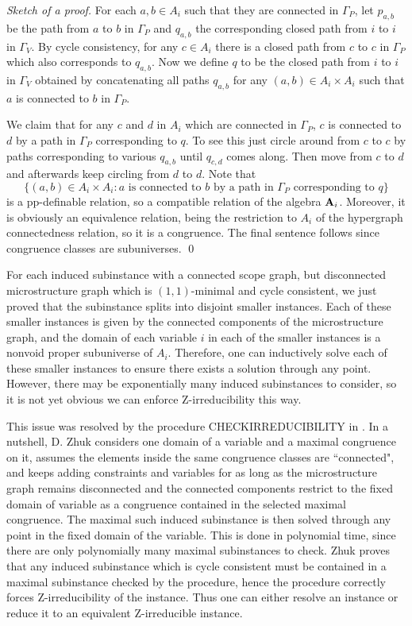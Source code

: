 \documentclass[11pt]{amsart}
\newcommand{\m}[1]{{\uppercase {\mathbf {#1}}}}
\theoremstyle{definition}
\begin{document}
{\em Sketch of a proof.}
For each $a,b\in A_i$ such that they are connected in $\Gamma_P$, let $p_{a,b}$ be the path from $a$ to $b$ in $\Gamma_P$ and $q_{a,b}$ the corresponding closed path from $i$ to $i$ in $\Gamma_V$. By cycle consistency, for any $c\in A_i$ there is a closed path from $c$ to $c$ in $\Gamma_P$ which also corresponds to $q_{a,b}$. Now we define $q$ to be the closed path from $i$ to $i$ in $\Gamma_V$ obtained by concatenating all paths $q_{a,b}$ for any $(a,b)\in A_i\times A_i$ such that $a$ is connected to $b$ in $\Gamma_P$. 

We claim that for any $c$ and $d$ in $A_i$ which are connected in $\Gamma_P$, $c$ is connected to $d$ by a path in $\Gamma_P$ corresponding to $q$. To see this just circle around from $c$ to $c$ by paths corresponding to various $q_{a,b}$ until $q_{c,d}$ comes along. Then move from $c$ to $d$ and afterwards keep circling from $d$ to $d$. Note that
$$\{(a,b)\in A_i\times A_i: a\text{ is connected to }b\text{ by a path in }\Gamma_P\text{ corresponding to }q\}$$
is a pp-definable relation, so a compatible relation of the algebra $\m a_i$. Moreover, it is obviously an equivalence relation, being the restriction to $A_i$ of the hypergraph connectedness relation, so it is a congruence. The final sentence follows since congruence classes are subuniverses.
\qed

For each induced subinstance with a connected scope graph, but disconnected microstructure graph which is $(1,1)$-minimal and cycle consistent, we just proved that the subinstance splits into disjoint smaller instances. Each of these smaller instances is given by the connected components of the microstructure graph, and the domain of each variable $i$ in each of the smaller instances is a nonvoid proper subuniverse of $A_i$. Therefore, one can inductively solve each of these smaller instances to ensure there exists a solution through any point. However, there may be exponentially many induced subinstances to consider, so it is not yet obvious we can enforce Z-irreducibility this way.

This issue was resolved by the procedure CHECKIRREDUCIBILITY in \cite{Zhdich}. In a nutshell, D. Zhuk considers one domain of a variable and a maximal congruence on it, assumes the elements inside the same congruence classes are ``connected", and keeps adding constraints and variables for as long as the microstructure graph remains disconnected and the connected components restrict to the fixed domain of variable as a congruence contained in the selected maximal congruence. The maximal such induced subinstance is then solved through any point in the fixed domain of the variable. This is done in polynomial time, since there are only polynomially many maximal subinstances to check. Zhuk proves that any induced subinstance which is cycle consistent must be contained in a maximal subinstance checked by the procedure, hence the procedure correctly forces Z-irreducibility of the instance. Thus one can either resolve an instance or reduce it to an equivalent Z-irreducible instance.
\end{document}
